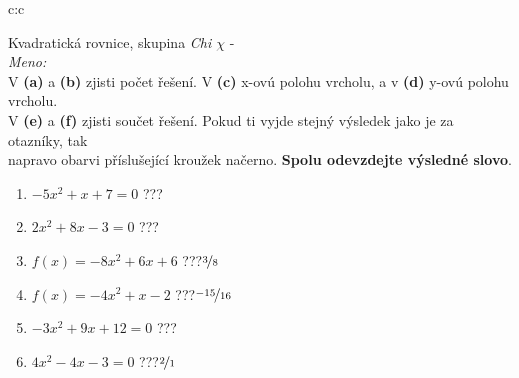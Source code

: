 \documentclass[10pt]{report}
\begin{document}
\clearpage
\thispagestyle{empty}
\begin{tabular}{c:c}
\begin{minipage}[c][99mm][t]{0.49\linewidth}
\begin{center}
\vspace{7mm}
{\huge Kvadratická rovnice, skupina \textit{Chi $\chi$} -}\\[4.5mm]
\textit{Meno:}\phantom{xxxxxxxxxxxxxxxxxxxxxxxxxxxxxxxxxxxxxxxxxxxxxxxxxxxxxxxxxxxxxxxxx}\\[3.5mm]
V \textbf{(a)} a \textbf{(b)} zjisti počet řešení. V \textbf{(c)} x-ovú polohu vrcholu, a v \textbf{(d)} y-ovú polohu vrcholu.\\V \textbf{(e)} a \textbf{(f)} zjisti součet řešení. Pokud ti vyjde stejný výsledek jako je za otazníky, tak\\napravo obarvi příslušející kroužek načerno. \textbf{Spolu odevzdejte výsledné slovo}.\\[3mm]
\begin{minipage}{0.77\linewidth}
\begin{center}
\begin{varwidth}{\textwidth}
\begin{enumerate}
\large
\item $-5x^2+x+7=0$\quad \dotfill\; ???\;\dotfill {}
\item $2x^2+8x-3=0$\quad \dotfill\; ???\;\dotfill {}
\item $f(x)=-8x^2+6x+6$\quad \dotfill\; ???\;\dotfill \quad $\nicefrac{3}{8}$
\item $f(x)=-4x^2+x-2$\quad \dotfill\; ???\;\dotfill \quad $\nicefrac{-15}{16}$
\item $-3x^2+9x+12=0$\quad \dotfill\; ???\;\dotfill {}
\item $4x^2-4x-3=0$\quad \dotfill\; ???\;\dotfill \quad $\nicefrac{2}{1}$
\end{enumerate}
\end{varwidth}
\end{center}
\end{minipage}

\end{center}
\end{minipage}
\end{tabular}
\end{document}
